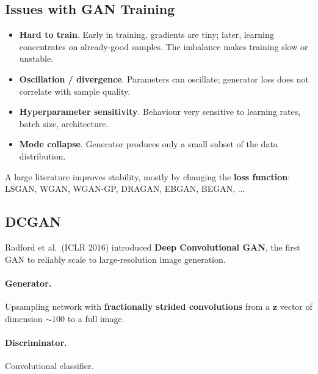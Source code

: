 \documentclass[11pt,a4paper]{article}
\theoremstyle{definition}
\theoremstyle{plain}
\theoremstyle{remark}
\begin{document}
\subsection{Issues with GAN Training}

\begin{tcolorbox}[colback=red!5!white, colframe=red!60!black, title={Common GAN pathologies}]
\begin{itemize}
    \item \textbf{Hard to train}. Early in training, gradients are tiny; later, learning concentrates on already-good samples. The imbalance makes training slow or unstable.
    \item \textbf{Oscillation / divergence}. Parameters can oscillate; generator loss does not correlate with sample quality.
    \item \textbf{Hyperparameter sensitivity}. Behaviour very sensitive to learning rates, batch size, architecture.
    \item \textbf{Mode collapse}. Generator produces only a small subset of the data distribution.
\end{itemize}
\end{tcolorbox}

A large literature improves stability, mostly by changing the \textbf{loss function}: LSGAN, WGAN, WGAN-GP, DRAGAN, EBGAN, BEGAN, $\ldots$

\subsection{DCGAN}

Radford et al.\ (ICLR 2016) introduced \textbf{Deep Convolutional GAN}, the first GAN to reliably scale to large-resolution image generation.

\paragraph{Generator.} Upsampling network with \textbf{fractionally strided convolutions} from a $\mathbf{z}$ vector of dimension $\sim 100$ to a full image.

\paragraph{Discriminator.} Convolutional classifier.
\end{document}
